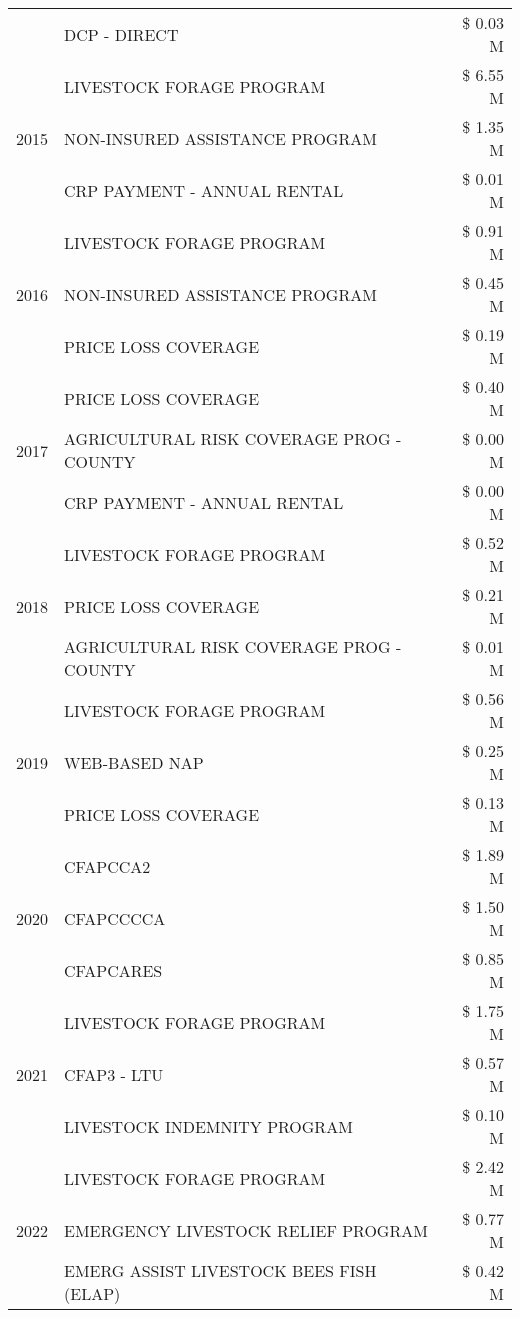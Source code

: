 \begin{tabular}{llr}
 & DCP - DIRECT & \$ 0.03 M \\
\cline{1-3}
\multirow[t]{3}{*}{2015} & LIVESTOCK FORAGE PROGRAM & \$ 6.55 M \\
 & NON-INSURED ASSISTANCE PROGRAM & \$ 1.35 M \\
 & CRP PAYMENT - ANNUAL RENTAL & \$ 0.01 M \\
\cline{1-3}
\multirow[t]{3}{*}{2016} & LIVESTOCK FORAGE PROGRAM & \$ 0.91 M \\
 & NON-INSURED ASSISTANCE PROGRAM & \$ 0.45 M \\
 & PRICE LOSS COVERAGE & \$ 0.19 M \\
\cline{1-3}
\multirow[t]{3}{*}{2017} & PRICE LOSS COVERAGE & \$ 0.40 M \\
 & AGRICULTURAL RISK COVERAGE PROG - COUNTY & \$ 0.00 M \\
 & CRP PAYMENT - ANNUAL RENTAL & \$ 0.00 M \\
\cline{1-3}
\multirow[t]{3}{*}{2018} & LIVESTOCK FORAGE PROGRAM & \$ 0.52 M \\
 & PRICE LOSS COVERAGE & \$ 0.21 M \\
 & AGRICULTURAL RISK COVERAGE PROG - COUNTY & \$ 0.01 M \\
\cline{1-3}
\multirow[t]{3}{*}{2019} & LIVESTOCK FORAGE PROGRAM & \$ 0.56 M \\
 & WEB-BASED NAP & \$ 0.25 M \\
 & PRICE LOSS COVERAGE & \$ 0.13 M \\
\cline{1-3}
\multirow[t]{3}{*}{2020} & CFAPCCA2 & \$ 1.89 M \\
 & CFAPCCCCA & \$ 1.50 M \\
 & CFAPCARES & \$ 0.85 M \\
\cline{1-3}
\multirow[t]{3}{*}{2021} & LIVESTOCK FORAGE PROGRAM & \$ 1.75 M \\
 & CFAP3 - LTU & \$ 0.57 M \\
 & LIVESTOCK INDEMNITY PROGRAM & \$ 0.10 M \\
\cline{1-3}
\multirow[t]{3}{*}{2022} & LIVESTOCK FORAGE PROGRAM & \$ 2.42 M \\
 & EMERGENCY LIVESTOCK RELIEF PROGRAM & \$ 0.77 M \\
 & EMERG ASSIST LIVESTOCK BEES FISH (ELAP) & \$ 0.42 M \\
\cline{1-3}
\bottomrule
\end{tabular}
